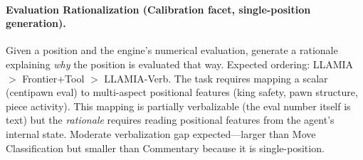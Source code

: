 \paragraph{Evaluation Rationalization (Calibration facet,
single-position generation).}
Given a position and the engine's numerical evaluation, generate a
rationale explaining \emph{why} the position is evaluated that way.
Expected ordering: LLAMIA $>$ Frontier+Tool $>$ LLAMIA-Verb.
The task requires mapping a scalar (centipawn eval) to multi-aspect
positional features (king safety, pawn structure, piece activity).
This mapping is partially verbalizable (the eval number itself is
text) but the \emph{rationale} requires reading positional features
from the agent's internal state. Moderate verbalization gap
expected---larger than Move Classification but smaller than
Commentary because it is single-position.

% 